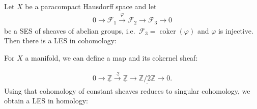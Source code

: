 \begin{theorem}[(Important!)]

Let \(X\) be a paracompact Hausdorff space and let
\begin{align*}
0 \to \mathcal{F}_1 \xrightarrow{\varphi} \mathcal{F}_2 \to \mathcal{F}_3 \to 0   
\end{align*}
be a SES of sheaves of abelian groups,
i.e.~\(\mathcal{F}_3 = \operatorname{coker}(\varphi)\) and \(\varphi\)
is injective. Then there is a LES in cohomology:

\begin{center}
\end{center}

\end{theorem}

\begin{example}[?]

For \(X\) a manifold, we can define a map and its cokernel sheaf:

\begin{align*}
0 \to \underline{{\mathbb{Z}}} \xrightarrow{\cdot 2} \underline{{\mathbb{Z}}} \to \underline{{\mathbb{Z}}/2{\mathbb{Z}}} \to 0
.\end{align*}
Using that cohomology of constant sheaves reduces to singular
cohomology, we obtain a LES in homology:

\begin{center}
\end{center}

\end{example}

